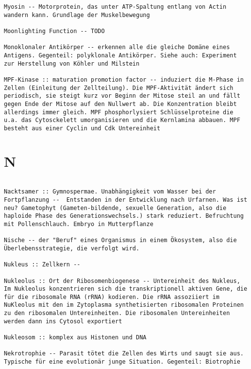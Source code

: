 \documentclass{article}
\begin{document}
\begin{verbatim}
Myosin -- Motorprotein, das unter ATP-Spaltung entlang von Actin wandern kann. Grundlage der Muskelbewegung

Moonlighting Function -- TODO

Monoklonaler Antikörper -- erkennen alle die gleiche Domäne eines Antigens. Gegenteil: polyklonale Antikörper. Siehe auch: Experiment zur Herstellung von Köhler und Milstein

MPF-Kinase :: maturation promotion factor -- induziert die M-Phase in Zellen (Einleitung der Zellteilung). Die MPF-Aktivität ändert sich periodisch, sie steigt kurz vor Beginn der Mitose steil an und fällt gegen Ende der Mitose auf den Nullwert ab. Die Konzentration bleibt allerdings immer gleich. MPF phosphorlysiert Schlüsselproteine die u.a. das Cytosckelett umorganisieren und die Kernlamina abbauen. MPF besteht aus einer Cyclin und Cdk Untereinheit

\end{verbatim}
\newpage


\section{N}
\begin{verbatim}

Nacktsamer :: Gymnospermae. Unabhängigkeit vom Wasser bei der Fortpflanzung --  Entstanden in der Entwicklung nach Urfarnen. Was ist neu? Gametophyt (Gameten-bildende, sexuelle Generation, also die haploide Phase des Generationswechsels.) stark reduziert. Befruchtung mit Pollenschlauch. Embryo in Mutterpflanze

Nische -- der "Beruf" eines Organismus in einem Ökosystem, also die Überlebensstrategie, die verfolgt wird.

Nukleus :: Zellkern --

Nukleolus :: Ort der Ribosomenbiogenese -- Untereinheit des Nukleus, Im Nukleolus konzentrieren sich die transkriptionell aktiven Gene, die für die ribosomale RNA (rRNA) kodieren. Die rRNA assoziiert im NuKleolus mit den im Zytoplasma synthetisierten ribosomalen Proteinen zu den ribosomalen Untereinheiten. Die ribosomalen Untereinheiten werden dann ins Cytosol exportiert

Nukleosom :: komplex aus Histonen und DNA

Nekrotrophie -- Parasit tötet die Zellen des Wirts und saugt sie aus. Typische für eine evolutionär junge Situation. Gegenteil: Biotrophie


\end{verbatim}
\newpage
\end{document}
